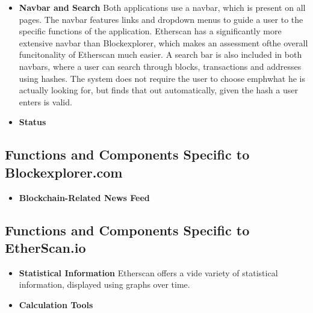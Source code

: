 \begin{itemize}
\item \textbf{Navbar and Search}
Both applications use a navbar, which is present on all pages. The navbar features links and dropdown menus to guide a user to the specific functions of the application. Etherscan has a significantly more extensive navbar than Blockexplorer, which makes an assessment ofthe overall funcitonality of Etherscan much easier. A search bar is also included in both navbars, where a user can search through blocks, transactions and addresses using hashes. The system does not require the user to choose emph{what} he is actually looking for, but finds that out automatically, given the hash a user enters is valid.
\item \textbf{Status}
\end{itemize}

\subsection{Functions and Components Specific to Blockexplorer.com}

\begin{itemize}
\item \textbf{Blockchain-Related News Feed}

\end{itemize}

\subsection{Functions and Components Specific to EtherScan.io}

\begin{itemize}
\item \textbf{Statistical Information}
Etherscan offers a vide variety of statistical information, displayed using graphs over time. 
\item \textbf{Calculation Tools}
\end{itemize}

